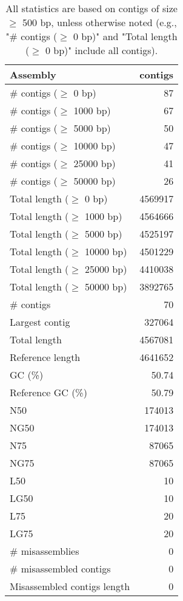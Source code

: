 \documentclass[12pt,a4paper]{article}
\begin{document}
\begin{table}[ht]
\begin{center}
\caption{All statistics are based on contigs of size $\geq$ 500 bp, unless otherwise noted (e.g., "\# contigs ($\geq$ 0 bp)" and "Total length ($\geq$ 0 bp)" include all contigs).}
\begin{tabular}{|l*{1}{|r}|}
\hline
Assembly & contigs \\ \hline
\# contigs ($\geq$ 0 bp) & 87 \\ \hline
\# contigs ($\geq$ 1000 bp) & 67 \\ \hline
\# contigs ($\geq$ 5000 bp) & 50 \\ \hline
\# contigs ($\geq$ 10000 bp) & 47 \\ \hline
\# contigs ($\geq$ 25000 bp) & 41 \\ \hline
\# contigs ($\geq$ 50000 bp) & 26 \\ \hline
Total length ($\geq$ 0 bp) & 4569917 \\ \hline
Total length ($\geq$ 1000 bp) & 4564666 \\ \hline
Total length ($\geq$ 5000 bp) & 4525197 \\ \hline
Total length ($\geq$ 10000 bp) & 4501229 \\ \hline
Total length ($\geq$ 25000 bp) & 4410038 \\ \hline
Total length ($\geq$ 50000 bp) & 3892765 \\ \hline
\# contigs & 70 \\ \hline
Largest contig & 327064 \\ \hline
Total length & 4567081 \\ \hline
Reference length & 4641652 \\ \hline
GC (\%) & 50.74 \\ \hline
Reference GC (\%) & 50.79 \\ \hline
N50 & 174013 \\ \hline
NG50 & 174013 \\ \hline
N75 & 87065 \\ \hline
NG75 & 87065 \\ \hline
L50 & 10 \\ \hline
LG50 & 10 \\ \hline
L75 & 20 \\ \hline
LG75 & 20 \\ \hline
\# misassemblies & 0 \\ \hline
\# misassembled contigs & 0 \\ \hline
Misassembled contigs length & 0 \\ \hline

\end{tabular}
\end{center}
\end{table}
\end{document}

